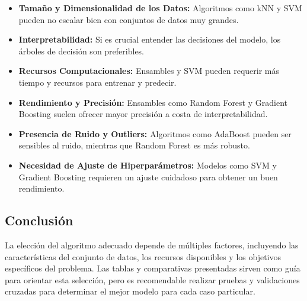 \documentclass[a4paper, 11pt]{article}
\begin{document}
\begin{itemize}
    \item \textbf{Tamaño y Dimensionalidad de los Datos:} Algoritmos como kNN y SVM pueden no escalar bien con conjuntos de datos muy grandes.

    \item \textbf{Interpretabilidad:} Si es crucial entender las decisiones del modelo, los árboles de decisión son preferibles.

    \item \textbf{Recursos Computacionales:} Ensambles y SVM pueden requerir más tiempo y recursos para entrenar y predecir.

    \item \textbf{Rendimiento y Precisión:} Ensambles como Random Forest y Gradient Boosting suelen ofrecer mayor precisión a costa de interpretabilidad.

    \item \textbf{Presencia de Ruido y Outliers:} Algoritmos como AdaBoost pueden ser sensibles al ruido, mientras que Random Forest es más robusto.

    \item \textbf{Necesidad de Ajuste de Hiperparámetros:} Modelos como SVM y Gradient Boosting requieren un ajuste cuidadoso para obtener un buen rendimiento.
\end{itemize}

\subsection{Conclusión}

La elección del algoritmo adecuado depende de múltiples factores, incluyendo las características del conjunto de datos, los recursos disponibles y los objetivos específicos del problema. Las tablas y comparativas presentadas sirven como guía para orientar esta selección, pero es recomendable realizar pruebas y validaciones cruzadas para determinar el mejor modelo para cada caso particular.
\end{document}
